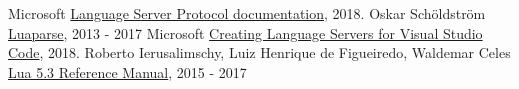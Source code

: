  Microsoft \href{https://microsoft.github.io/language-server-protocol/specification#initialize}{Language Server Protocol documentation}, 2018.
 Oskar Schöldström \href{https://oxyc.github.io/luaparse/}{Luaparse}, 2013 - 2017
 Microsoft \href{https://code.visualstudio.com/docs/extensions/example-language-server}{Creating Language Servers for Visual Studio Code}, 2018.
 Roberto Ierusalimschy, Luiz Henrique de Figueiredo, Waldemar Celes \href{https://www.lua.org/manual/5.3/manual.html}{Lua 5.3 Reference Manual}, 2015 - 2017
